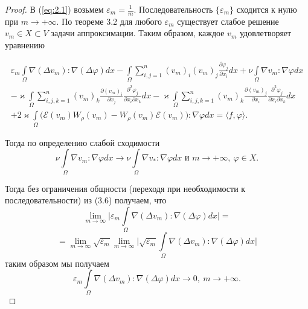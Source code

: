 \begin{proof}
    В (\ref{eq:2.1}) возьмем $\varepsilon_m = \frac{1}{m}$. Последовательность $\{\varepsilon_m\}$ сходится к нулю при $m \rightarrow +\infty$.
    По теореме 3.2 для любого $\varepsilon_m$ существует слабое решение $v_m \in X \subset V$ задачи аппроксимации.
    Таким образом, каждое $v_m$ удовлетворяет уравнению

    \begin{equation}\label{eq:4.1}
        \begin{gathered}
            \varepsilon_m \int\limits_{\Omega} \nabla (\Delta v_m): \nabla (\Delta \varphi) dx -
            \int\limits_{\Omega}\sum_{i,j=1}^n (v_m)_i (v_m)_j \frac{\partial \varphi_j}{\partial x_i} dx + \nu
            \int\limits_{\Omega} \nabla v_m: \nabla \varphi dx\\
            -\varkappa \int\limits_{\Omega}\sum_{i,j,k=1}^n (v_m)_k
            \frac{\partial (v_m)_i}{\partial x_j} \frac{\partial^2 \varphi_j}{\partial x_i \partial x_k} dx - \varkappa \int\limits_{\Omega}\sum_{i,j,k=1}^n
            (v_m)_k \frac{\partial (v_m)_j}{\partial x_i} \frac{\partial^2 \varphi_j}{\partial x_i \partial x_k} dx\\
            +2\varkappa \int\limits_{\Omega} \bigg(\mathcal{E}(v_m)W_\rho (v_m) - W_\rho(v_m)\mathcal{E}(v_m)\bigg): \nabla\varphi dx =
            \langle f, \varphi \rangle.
        \end{gathered}
    \end{equation}

    Тогда по определению слабой сходимости
    $$\nu\int\limits_{\Omega}\nabla v_m: \nabla\varphi dx \rightarrow \nu \int\limits_{\Omega} \nabla v_*: \nabla\varphi dx
    \textrm{ и } m \rightarrow +\infty, \ \varphi \in X.$$

    Тогда без ограничения общности (переходя при необходимости к последовательности) из (3.6) получаем, что
    $$\lim_{m \rightarrow \infty}\bigg| \varepsilon_m \int\limits_{\Omega} \nabla (\Delta v_m): \nabla (\Delta \varphi) dx \bigg| =$$
    $$=\lim_{m \rightarrow \infty} \sqrt{\varepsilon_m} \lim_{m \rightarrow \infty}\bigg|\sqrt{\varepsilon_m}
    \int\limits_{\Omega} \nabla (\Delta v_m): \nabla (\Delta \varphi) dx \bigg|$$
    таким образом мы получаем
    $$\varepsilon_m \int\limits_{\Omega} \nabla (\Delta v_m): \nabla (\Delta \varphi) dx \rightarrow 0, \ m \rightarrow +\infty.$$


\end{proof}
